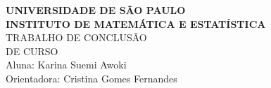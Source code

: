 \documentclass[a4paper,12pt]{article}
\begin{document}
 
\begin{center}
   {\large \textbf{UNIVERSIDADE DE SÃO PAULO}} \\[1.4cm]
   
   {\large \textbf{INSTITUTO DE MATEMÁTICA E ESTATÍSTICA}}\\[4.2cm]
   
   {\Huge TRABALHO DE CONCLUSÃO }\\[0.3cm]
   {\Huge DE CURSO }\\[9cm]
   
   {\large { Aluna: Karina Suemi Awoki}}\\[0.3cm]
   
   {\large { Orientadora: Cristina Gomes Fernandes}}
   

\end{center}

\newpage
\tableofcontents












    










\end{document}
